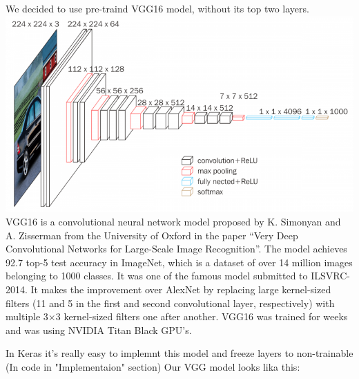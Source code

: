 We decided to use pre-traind VGG16 model, without its top two layers.\\

{\includegraphics[scale=0.5]{./images/vgg16.png}} \\

VGG16 is a convolutional neural network model proposed by K. Simonyan and A. Zisserman
from the University of Oxford in the paper “Very Deep Convolutional Networks
for Large-Scale Image Recognition”. The model achieves 92.7%
top-5 test accuracy in ImageNet, which is a dataset of over 14 million
images belonging to 1000 classes. It was one of the famous model submitted
to ILSVRC-2014. It makes the improvement over AlexNet by replacing large
kernel-sized filters (11 and 5 in the first and second convolutional layer,
respectively) with multiple 3×3 kernel-sized filters one after another. VGG16
was trained for weeks and was using NVIDIA Titan Black GPU’s.

In Keras it's really easy to implemnt this model and freeze layers to non-trainable (In code in "Implementaion" section)
Our VGG model looks lika this:\\

